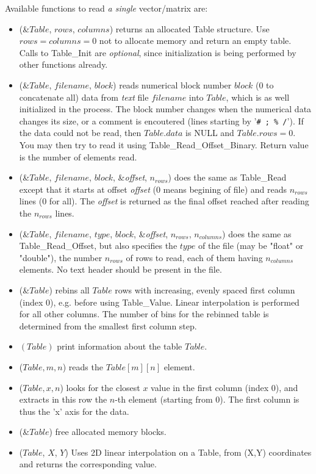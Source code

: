 Available functions to read \emph{a single} vector/matrix are:
\begin{itemize}
\item {}(\&$Table$, $rows$, $columns$) returns an allocated
  Table structure. Use $rows=columns=0$ not to allocate memory and return an empty table.
  Calls to Table\_Init are \emph{optional}, since initialization is being
  performed by other functions already.
\item {}(\&$Table$, $filename$, $block$)
  reads numerical block number
  $block$ (0 to concatenate all) data from \emph{text} file $filename$ into $Table$,
  which is as well initialized in the process.
  The block number changes when the numerical data changes its size,
  or a comment is encoutered (lines starting
  by '\verb+# ; % /+'). If the data could not be read,
  then $Table.data$ is NULL and $Table.rows = 0$.
  You may then try to read it using Table\_Read\_Offset\_Binary.
  Return value is the number of elements read.
\item {}(\&$Table$, $filename$, $block$, \&\textit{offset}, $n_{rows}$)
  does the same as Table\_Read except that it starts at offset \textit{offset}
  (0 means begining of file) and reads $n_{rows}$ lines (0 for all).
  The \textit{offset} is returned as the final offset reached after
  reading the $n_{rows}$ lines.
\item {}(\&$Table$, $filename$, $type$,
  $block$, \&\textit{offset}, $n_{rows}$, $n_{columns}$) does the same as
  Table\_Read\_Offset, but also specifies the $type$ of the file (may
  be "float" or "double"), the number $n_{rows}$ of rows to read, each
  of them having $n_{columns}$ elements. No text header should be present
  in the file.
\item {}(\&$Table$) rebins all $Table$ rows with increasing, evenly spaced first column (index 0), e.g. before using Table\_Value. Linear interpolation is performed for all other columns. The number of bins for the rebinned table is determined from the smallest first column step.
\item {}$(Table)$ print information about the table $Table$.
\item {}($Table, m, n$) reads the $Table[m][n]$ element.
\item {}($Table, x, n$) looks for the closest $x$
  value in the first column (index 0), and extracts in this row the
  $n$-th element (starting from 0). The first column is thus the 'x' axis for the data.
\item {}(\&$Table$) free allocated memory blocks.
\item {}($Table$, $X$, $Y$) Uses 2D linear interpolation on a Table, from (X,Y) coordinates and returns the corresponding value.
\end{itemize}

